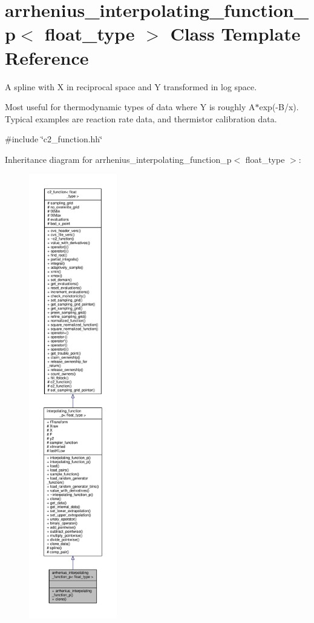 \hypertarget{classarrhenius__interpolating__function__p}{}\section{arrhenius\+\_\+interpolating\+\_\+function\+\_\+p$<$ float\+\_\+type $>$ Class Template Reference}
\label{classarrhenius__interpolating__function__p}


A spline with X in reciprocal space and Y transformed in log space.

Most useful for thermodynamic types of data where Y is roughly A$\ast$exp(-\/\+B/x). Typical examples are reaction rate data, and thermistor calibration data.  




{\ttfamily \#include \char`\"{}c2\+\_\+function.\+hh\char`\"{}}



Inheritance diagram for arrhenius\+\_\+interpolating\+\_\+function\+\_\+p$<$ float\+\_\+type $>$\+:
\nopagebreak
\begin{figure}[H]
\begin{center}
\leavevmode
\includegraphics[height=550pt]{classarrhenius__interpolating__function__p__inherit__graph}
\end{center}
\end{figure}


